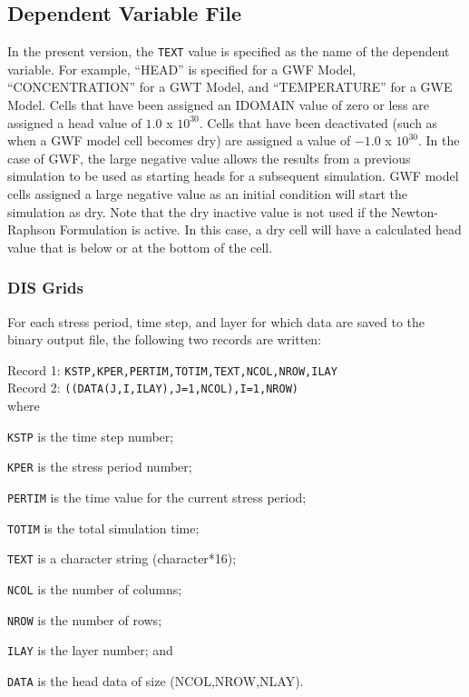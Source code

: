 \subsection{Dependent Variable File}
In the present \mf version, the \texttt{TEXT} value is specified as the name of the dependent variable.  For example, ``HEAD'' is specified for a GWF Model, ``CONCENTRATION'' for a GWT Model, and ``TEMPERATURE'' for a GWE Model.  Cells that have been assigned an IDOMAIN value of zero or less are assigned a head value of $1.0$ x $10^{30}$.  Cells that have been deactivated (such as when a GWF model cell becomes dry) are assigned a value of $-1.0$ x $10^{30}$.  In the case of GWF, the large negative value allows the results from a previous simulation to be used as starting heads for a subsequent simulation.  GWF model cells assigned a large negative value as an initial condition will start the simulation as dry.  Note that the dry inactive value is not used if the Newton-Raphson Formulation is active.  In this case, a dry cell will have a calculated head value that is below or at the bottom of the cell.

\subsubsection{DIS Grids}
For each stress period, time step, and layer for which data are saved to the binary output file, the following two records are written:

\vspace{5mm}
\noindent Record 1: \texttt{KSTP,KPER,PERTIM,TOTIM,TEXT,NCOL,NROW,ILAY} \\
\noindent Record 2: \texttt{((DATA(J,I,ILAY),J=1,NCOL),I=1,NROW)} \\

\vspace{5mm}
\noindent where

\begin{description} \itemsep0pt \parskip0pt 
\item \texttt{KSTP} is the time step number;
\item \texttt{KPER} is the stress period number;
\item \texttt{PERTIM} is the time value for the current stress period; 
\item \texttt{TOTIM} is the total simulation time;
\item \texttt{TEXT} is a character string (character*16);
\item \texttt{NCOL} is the number of columns;
\item \texttt{NROW} is the number of rows;
\item \texttt{ILAY} is the layer number; and
\item \texttt{DATA} is the head data of size (NCOL,NROW,NLAY).
\end{description}

